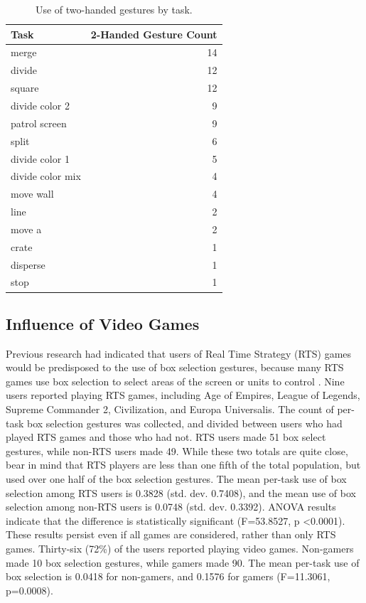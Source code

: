 \begin{table}
	\centering
	\begin{tabular}{l r}
		Task & 2-Handed Gesture Count\\
		\hline
		merge&14\\
		divide&12\\
		square&12\\
		divide color 2&9\\
		patrol screen&9\\
		split&6\\
		divide color 1&5\\
		divide color mix&4\\
		move wall&4\\
		line&2\\
		move a&2\\
		crate&1\\
		disperse&1\\
		stop&1
	\end{tabular}
	\caption{Use of two-handed gestures by task.}
\end{table}

\subsection{Influence of Video Games}

Previous research had indicated that users of Real Time Strategy (RTS) games would be predisposed to the use of box selection gestures, because many RTS games use box selection to select areas of the screen or units to control \citep{micire2010multi}. 
Nine users reported playing RTS games, including Age of Empires, League of Legends, Supreme Commander 2, Civilization, and Europa Universalis. 
The count of per-task box selection gestures was collected, and divided between users who had played RTS games and those who had not. 
RTS users made 51 box select gestures, while non-RTS users made 49.
While these two totals are quite close, bear in mind that RTS players are less than one fifth of the total population, but used over one half of the box selection gestures. 
The mean per-task use of box selection among RTS users is 0.3828 (std. dev. 0.7408), and the mean use of box selection among non-RTS users is 0.0748 (std. dev. 0.3392). 
ANOVA results indicate that the difference is statistically significant (F=53.8527, p \textless 0.0001).
These results persist even if all games are considered, rather than only RTS games.
Thirty-six (72\%) of the users reported playing video games.
Non-gamers made 10 box selection gestures, while gamers made 90. 
The mean per-task use of box selection is 0.0418 for non-gamers, and 0.1576 for gamers (F=11.3061, p=0.0008).

